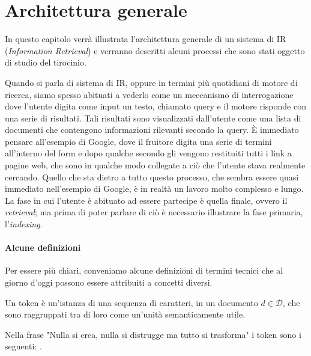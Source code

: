 \section{Architettura generale}
In questo capitolo verrà illustrata l'architettura generale di un sistema di IR (\textit{Information Retrieval}) e verranno
descritti alcuni processi che sono stati oggetto di studio del tirocinio.

Quando si parla di sistema di IR, oppure in termini più quotidiani di motore di ricerca,
siamo spesso abituati a vederlo come un meccanismo di interrogazione dove l'utente
digita come input un testo, chiamato query e il motore risponde con una serie di risultati. Tali risultati
sono visualizzati dall'utente come una lista di documenti che contengono informazioni
rilevanti secondo la query.
\`E immediato pensare all'esempio di Google, dove il fruitore digita una serie di termini
all'interno del  form e dopo qualche secondo gli vengono restituiti tutti i link a pagine web, che
sono in qualche modo collegate a ciò che l'utente stava realmente cercando.
Quello che sta dietro a tutto questo processo, che sembra essere quasi immediato nell'esempio di Google, è
in realtà un lavoro molto complesso e lungo.
La fase in cui l'utente è abituato ad essere partecipe è quella finale, ovvero
il \textit{retrieval}; ma prima di poter parlare di ciò è necessario illustrare la fase primaria, l'\textit{indexing}.

\paragraph{Alcune definizioni}
Per essere più chiari, conveniamo alcune definizioni di termini tecnici che al giorno d'oggi possono essere attribuiti
a concetti diversi.

\begin{definizione}\label{def:token}
	Un token è un'istanza di una sequenza di caratteri, in un documento $d \in \mathcal{D}$, che
	sono raggruppati tra di loro come un'unità semanticamente utile.
\end{definizione}

\begin{esempio}[tokenizzazione]
	Nella frase "Nulla si crea, nulla si distrugge ma tutto si trasforma" i token sono i seguenti:
	     
	   .
\end{esempio}

